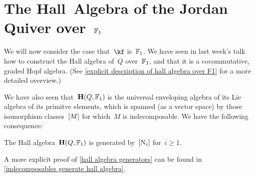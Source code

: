 \documentclass[a4paper, 11pt, twoside=semi]{scrartcl}
\begin{document}
\section{The Hall~Algebra of the Jordan Quiver over~$\mathbb{F}_1$}

We will now consider the case that~$\kf$ is~$\mathbb{F}_1$.
We have seen in last week’s talk how to construct the Hall algebra of~$Q$ over~$\mathbb{F}_1$, and that it is a cocommutative, graded Hopf algebra.
(See \cref{explicit description of hall algebra over F1} for a more detailed overview.)

We have also seen that~$\mathbf{H}(Q, \mathbb{F}_1)$ is the universal enveloping algebra of its Lie algebra of its primitve elements, which is spanned (as a vector space) by those isomorphism classes~$[M]$ for which~$M$ is indecomposable.
We have the following consequence:

\begin{corollary}
  \label{hall algebra generators}
  The Hall algebra~$\mathbf{H}(Q, \mathbb{F}_1)$ is generated by~$[\mathrm{N}_i]$ for~$i \geq 1$.
\end{corollary}

A more explicit proof of \cref{hall algebra generators} can be found in \cref{indecomposables generate hall algebra}.
\end{document}
